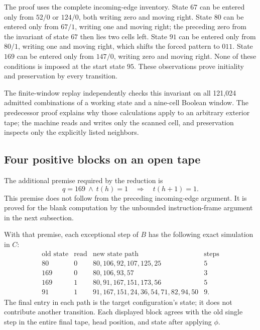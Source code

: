The proof uses the complete incoming-edge inventory.  State $67$ can be
entered only from $52/0$ or $124/0$, both writing zero and moving right.
State $80$ can be entered only from $67/1$, writing one and moving right;
the preceding zero from the invariant of state $67$ then lies two cells
left.  State $91$ can be entered only from $80/1$, writing one and moving
right, which shifts the forced pattern to $011$.  State $169$ can be
entered only from $147/0$, writing zero and moving right.  None of these
conditions is imposed at the start state $95$.  These observations prove
initiality and preservation by every transition.

The finite-window replay independently checks this invariant on all
121,024 admitted combinations of a working state and a nine-cell Boolean
window.  The predecessor proof explains why those calculations apply to
an arbitrary exterior tape; the machine reads and writes only the scanned
cell, and preservation inspects only the explicitly listed neighbors.

\subsection{Four positive blocks on an open tape}

The additional premise required by the reduction is
\begin{equation}\label{eq:boundary169-right-guard}
 q=169\ \wedge\ t(h)=1\quad\Longrightarrow\quad t(h+1)=1.
\end{equation}
This premise does not follow from the preceding incoming-edge argument.
It is proved for the blank computation by the unbounded instruction-frame
argument in the next subsection.

With that premise, each exceptional step of $B$ has the following exact
simulation in $C$:
\[
\begin{array}{c|c|l|r}
\text{old state}&\text{read}&\text{new state path}&\text{steps}\\\hline
80&0&80,106,92,107,125,25&5\\
169&0&80,106,93,57&3\\
169&1&80,91,167,151,173,56&5\\
91&1&91,167,151,24,36,54,71,82,94,50&9.
\end{array}
\]
The final entry in each path is the target configuration's state; it does
not contribute another transition.  Each displayed block agrees with the
old single step in the entire final tape, head position, and state after
applying $\phi$.

